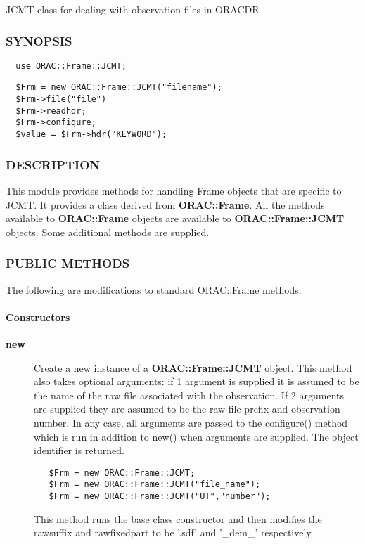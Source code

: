 JCMT class for dealing with observation files in ORACDR

\subsubsection*{SYNOPSIS\label{ORAC::Frame::JCMT_SYNOPSIS}}\begin{verbatim}
  use ORAC::Frame::JCMT;
\end{verbatim}
\begin{verbatim}
  $Frm = new ORAC::Frame::JCMT("filename");
  $Frm->file("file")
  $Frm->readhdr;
  $Frm->configure;
  $value = $Frm->hdr("KEYWORD");
\end{verbatim}
\subsubsection*{DESCRIPTION\label{ORAC::Frame::JCMT_DESCRIPTION}}

This module provides methods for handling Frame objects that
are specific to JCMT. It provides a class derived from \textbf{ORAC::Frame}.
All the methods available to \textbf{ORAC::Frame} objects are available
to \textbf{ORAC::Frame::JCMT} objects. Some additional methods are supplied.

\subsubsection*{PUBLIC METHODS\label{ORAC::Frame::JCMT_PUBLIC_METHODS}}

The following are modifications to standard ORAC::Frame methods.

\paragraph*{Constructors\label{ORAC::Frame::JCMT_Constructors}}\begin{description}
\item[\textbf{new}] \mbox{}

Create a new instance of a \textbf{ORAC::Frame::JCMT} object.
This method also takes optional arguments:
if 1 argument is  supplied it is assumed to be the name
of the raw file associated with the observation. If 2 arguments
are supplied they are assumed to be the raw file prefix and
observation number. In any case, all arguments are passed to
the configure() method which is run in addition to new()
when arguments are supplied.
The object identifier is returned.

\begin{verbatim}
   $Frm = new ORAC::Frame::JCMT;
   $Frm = new ORAC::Frame::JCMT("file_name");
   $Frm = new ORAC::Frame::JCMT("UT","number");
\end{verbatim}


This method runs the base class constructor and then modifies
the rawsuffix and rawfixedpart to be '.sdf' and '\_dem\_'
respectively.

\end{description}
